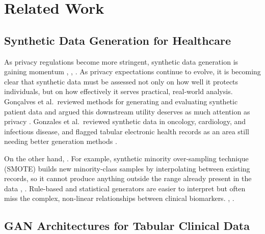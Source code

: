 
\section{Related Work}
\label{sec:related}

\subsection{Synthetic Data Generation for Healthcare}

As privacy regulations become more stringent, synthetic data generation is gaining momentum  \cite{goncalves2020}, \cite{gonzales2023}, \cite{guillaudeux2023}. As privacy expectations continue to evolve, it is becoming clear that synthetic data must be assessed not only on how well it protects individuals, but on how effectively it serves practical, real-world analysis. Gon\c{c}alves et al.\ reviewed methods for generating and evaluating synthetic patient data and argued this downstream utility deserves as much attention as privacy \cite{goncalves2020}. Gonzales et al.\ reviewed synthetic data in oncology, cardiology, and infectious disease, and flagged tabular electronic health records as an area still needing better generation methods \cite{gonzales2023}.

On the other hand, . For example, synthetic minority over-sampling technique (SMOTE) builds new minority-class samples by interpolating between existing records, so it cannot produce anything outside the range already present in the data \cite{kumari2024}, \cite{figueira2022}. Rule-based and statistical generators are easier to interpret but often miss the complex, non-linear relationships between clinical biomarkers.  \cite{yan2022}, \cite{nikolentzos2023}.

\subsection{GAN Architectures for Tabular Clinical Data}

